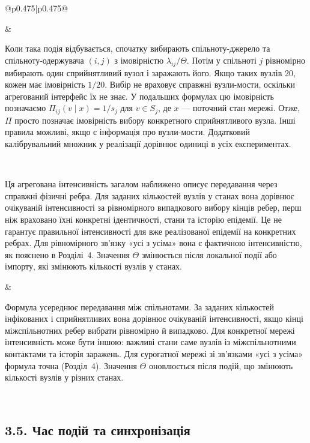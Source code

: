 \documentclass[11pt]{article}
\begin{document}
\begin{longtable}{@{}p{0.475\textwidth}|p{0.475\textwidth}@{}}
\begin{minipage}[t]{\linewidth}
\end{minipage} &
\begin{minipage}[t]{\linewidth}
Коли така подія відбувається, спочатку вибирають спільноту-джерело та спільноту-одержувача $(i,j)$ з імовірністю $\lambda_{ij}/\Theta$. Потім у спільноті $j$ рівномірно вибирають один сприйнятливий вузол і заражають його. Якщо таких вузлів 20, кожен має імовірність $1/20$. Вибір не враховує справжні вузли-мости, оскільки агрегований інтерфейс їх не знає. У подальших формулах цю імовірність позначаємо $\Pi_{ij}(v\mid x)=1/s_j$ для $v\in S_j$, де $x$ --- поточний стан мережі. Отже, $\Pi$ просто позначає імовірність вибору конкретного сприйнятливого вузла. Інші правила можливі, якщо є інформація про вузли-мости. Додатковий калібрувальний множник у реалізації дорівнює одиниці в усіх експериментах.
\end{minipage} \\[5mm]
\begin{minipage}[t]{\linewidth}
Ця агрегована інтенсивність загалом наближено описує передавання через справжні фізичні ребра. Для заданих кількостей вузлів у станах вона дорівнює очікуваній інтенсивності за рівномірного випадкового вибору кінців ребер, перш ніж враховано їхні конкретні ідентичності, стани та історію епідемії. Це не гарантує правильної інтенсивності для вже реалізованої епідемії на конкретних ребрах. Для рівномірного зв'язку «усі з усіма» вона є фактичною інтенсивністю, як пояснено в Розділі~4. Значення $\Theta$ змінюється після локальної події або імпорту, які змінюють кількості вузлів у станах.
\end{minipage} &
\begin{minipage}[t]{\linewidth}
Формула усереднює передавання між спільнотами. За заданих кількостей інфікованих і сприйнятливих вона дорівнює очікуваній інтенсивності, якщо кінці міжспільнотних ребер вибрати рівномірно й випадково. Для конкретної мережі інтенсивність може бути іншою: важливі стани саме вузлів із міжспільнотними контактами та історія заражень. Для сурогатної мережі зі зв'язками «усі з усіма» формула точна (Розділ~4). Значення $\Theta$ оновлюється після подій, що змінюють кількості вузлів у різних станах.
\end{minipage} \\[5mm]
\begin{minipage}[t]{\linewidth}
\subsection*{3.5. Час подій та синхронізація}


\end{minipage}
\end{longtable}
\end{document}
